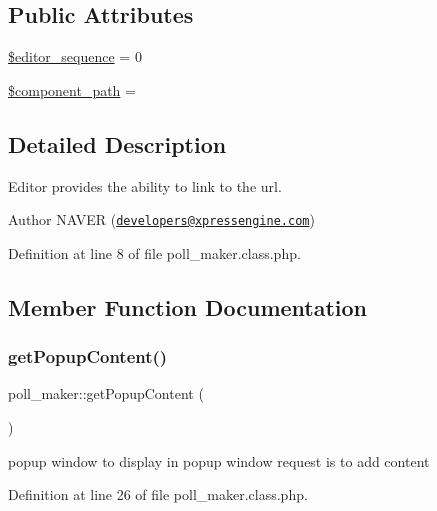 \subsection*{Public Attributes}
\begin{DoxyCompactItemize}
\item 
\hyperlink{classpoll__maker_a17d99b5a9fe1df8e90cc572590e8a5e6}{\$editor\+\_\+sequence} = 0
\item 
\hyperlink{classpoll__maker_aed45da13a32668475091fceb3a3e526d}{\$component\+\_\+path} = \textquotesingle{}\textquotesingle{}
\end{DoxyCompactItemize}


\subsection{Detailed Description}
Editor provides the ability to link to the url. 

\begin{DoxyAuthor}{Author}
N\+A\+V\+ER (\href{mailto:developers@xpressengine.com}{\tt developers@xpressengine.\+com}) 
\end{DoxyAuthor}


Definition at line 8 of file poll\+\_\+maker.\+class.\+php.



\subsection{Member Function Documentation}
\hypertarget{classpoll__maker_aa332538c710974acc59a6209bb1f5503}{}\label{classpoll__maker_aa332538c710974acc59a6209bb1f5503} 
\subsubsection{\texorpdfstring{get\+Popup\+Content()}{getPopupContent()}}
{\footnotesize\ttfamily poll\+\_\+maker\+::get\+Popup\+Content (\begin{DoxyParamCaption}{ }\end{DoxyParamCaption})}



popup window to display in popup window request is to add content 



Definition at line 26 of file poll\+\_\+maker.\+class.\+php.

